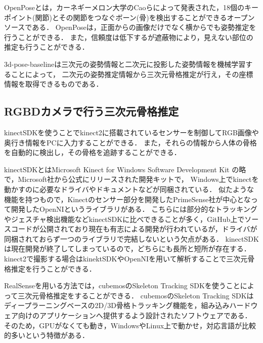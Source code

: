 \documentclass[titlepage]{jarticle}
\begin{document}
OpenPoseとは，カーネギーメロン大学のCaoらによって発表された，18個のキーポイント(関節)とその関節をつなぐボーン(骨)を検出することができるオープンソースである．
OpenPoseは，正面からの画像だけでなく横からでも姿勢推定を行うことができる．
また，信頼度は低下するが遮蔽物により，見えない部位の推定も行うことができる．

3d-pose-baselineは三次元の姿勢情報と二次元に投影した姿勢情報を機械学習することによって，
二次元の姿勢推定情報から三次元骨格推定が行え，その座標情報を取得できるものである．

\subsection{RGBDカメラで行う三次元骨格推定}
kinectSDK\cite{kinectSDK}を使うことでkinect2に搭載されているセンサーを制御してRGB画像や奥行き情報をPCに入力することができる．
また，それらの情報から人体の骨格を自動的に検出し，その骨格を追跡することができる．

kinectSDKとはMicrosoft Kinect for Windows Software Development Kit の略で，Microsoft社から公式にリリースされた開発キットで，
Windows上でkinectを動かすのに必要なドライバやドキュメントなどが同梱されている．
似たような機能を持つもので，Kinectのセンサー部分を開発したPrimeSense社が中心となって開発したOpenNIというライブラリがある．
こちらには部分的なトラッキングやジェスチャ検出機能などkinectSDKに比べできることが多く，GitHub上でソースコードが公開されており現在も有志による開発が行われているが，ドライバが同梱されておらず一つのライブラリで完結しないという欠点がある．
kinectSDKは現在開発が終了してしまっているので，どちらにも長所と短所が存在する．%
kinect2で撮影する場合はkinektSDKやOpenNIを用いて解析することで三次元骨格推定を行うことができる．

RealSenseを用いる方法では，cubemosのSkeleton Tracking SDK\cite{cubemos}を使うことによって三次元骨格推定をすることができる．
cubemosのSkeleton Tracking SDKはディープラーニングベースの2D/3D骨格トラッキング機能を，組み込みハードウェア向けのアプリケーションへ提供するよう設計されたソフトウェアである．
そのため，GPUがなくても動き，WindowsやLinux上で動かせ，対応言語が比較的多いという特徴がある．
%
%
%

%
%
\end{document}
